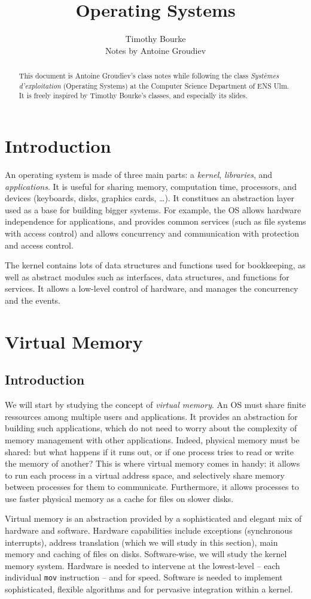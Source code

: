 \documentclass[toc]{../cs-classes/cs-classes}
\title{Operating Systems}
\author{Timothy Bourke\\ Notes by Antoine Groudiev}
\begin{document}
\begin{abstract}    
    This document is Antoine Groudiev's class notes while following the class \emph{Systèmes d'exploitation} (Operating Systems) at the Computer Science Department of ENS Ulm. It is freely inspired by Timothy Bourke's classes, and especially its slides.
\end{abstract}

\section*{Introduction}
An operating system is made of three main parts: a \emph{kernel}, \emph{libraries}, and \emph{applications}. It is useful for sharing memory, computation time, processors, and devices (keyboards, disks, graphics cards, \dots). It constitues an abstraction layer used as a base for building bigger systems. For example, the OS allows hardware independence for applications, and provides common services (such as file systems with access control) and allows concurrency and communication with protection and access control.

The kernel contains lots of data structures and functions used for bookkeeping, as well as abstract modules such as interfaces, data structures, and functions for services. It allows a low-level control of hardware, and manages the concurrency and the events.

\section{Virtual Memory}
\subsection{Introduction}
We will start by studying the concept of \emph{virtual memory}. An OS must share finite ressources among multiple users and applications. It provides an abstraction for building such applications, which do not need to worry about the complexity of memory management with other applications. Indeed, physical memory must be shared: but what happens if it runs out, or if one process tries to read or write the memory of another? This is where virtual memory comes in handy: it allows to run each process in a virtual address space, and selectively share memory between processes for them to communicate. Furthermore, it allows processes to use faster physical memory as a cache for files on slower disks.

Virtual memory is an abstraction provided by a sophisticated and elegant mix of hardware and software. Hardware capabilities include exceptions (synchronous interrupts), address translation (which we will study in this section), main memory and caching of files on disks. Software-wise, we will study the kernel memory system. Hardware is needed to intervene at the lowest-level -- each individual \texttt{mov} instruction -- and for speed. Software is needed to implement sophisticated, flexible algorithms and for pervasive integration within a kernel.
\end{document}
